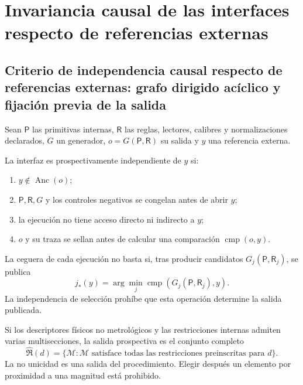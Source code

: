 \chapter{Invariancia causal de las interfaces respecto de referencias externas}
\label{chap:independencia-prospectiva}

\section{Criterio de independencia causal respecto de referencias externas: grafo dirigido acíclico y fijación previa de la salida}
\label{sec:definiciones-independencia-prospectiva}

Sean \(\mathsf P\) las primitivas internas, \(\mathsf R\) las reglas,
lectores, calibres y normalizaciones declarados, \(G\) un generador,
\(o=G(\mathsf P,\mathsf R)\) su salida y \(y\) una referencia externa.

\begin{definition}
\label{def:interfaz-prospectivamente-independiente}
La interfaz es prospectivamente independiente de \(y\) si:
\begin{enumerate}
 \item \(y\notin\operatorname{Anc}(o)\);
 \item \(\mathsf P,\mathsf R,G\) y los controles negativos se congelan antes
 de abrir \(y\);
 \item la ejecución no tiene acceso directo ni indirecto a \(y\);
 \item \(o\) y su traza se sellan antes de calcular una comparación
 \(\operatorname{cmp}(o,y)\).
\end{enumerate}
\end{definition}

\begin{definition}
\label{def:independencia-seleccion}
La ceguera de cada ejecución no basta si, tras producir candidatos
\(G_j(\mathsf P,\mathsf R_j)\), se publica
\[
 j_\ast(y)=\arg\min_j
 \operatorname{cmp}\!\left(G_j(\mathsf P,\mathsf R_j),y\right).
\]
La independencia de selección prohíbe que esta operación determine la salida
publicada.
\end{definition}

\begin{definition}
\label{def:prediccion-multivaluada}
Si los descriptores físicos no metrológicos y las restricciones internas
admiten varias multisecciones, la salida prospectiva es el conjunto completo
\[
 \widehat{\mathfrak R}(d)
 =\{\mathcal M:\mathcal M\text{ satisface todas las restricciones
 preinscritas para }d\}.
\]
La no unicidad es una salida del procedimiento. Elegir después un elemento
por proximidad a una magnitud está prohibido.
\end{definition}

